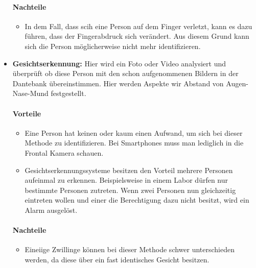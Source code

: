 \begin{itemize}
	\paragraph{Nachteile}
	\begin{itemize}
		\item In dem Fall, dass scih eine Person auf dem Finger verletzt, kann es dazu führen, dass der Fingerabdruck sich verändert. Aus diesem Grund kann sich die Person möglicherweise nicht mehr identifizieren.
	\end{itemize}
	\item \textbf{Gesichtserkennung:} Hier wird ein Foto oder Video analysiert und überprüft ob diese Person mit den schon aufgenommenen Bildern in der Dantebank übereinstimmen. Hier werden Aspekte wir Abstand von Augen-Nase-Mund festgestellt.
	\paragraph{Vorteile}
	\begin{itemize}
		\item Eine Person hat keinen oder kaum einen Aufwand, um sich bei dieser Methode zu identifizieren. Bei Smartphones muss man lediglich in die Frontal Kamera schauen.
		\item Gesichtserkennungssysteme besitzen den Vorteil mehrere Personen aufeinmal zu erkennen. Beispielsweise in einem Labor dürfen nur bestimmte Personen zutreten. Wenn zwei Personen nun gleichzeitig eintreten wollen und einer die Berechtigung dazu nicht besitzt, wird ein Alarm ausgelöst.
	\end{itemize}
	\paragraph{Nachteile}
	\begin{itemize}
		\item Eineiige Zwillinge können bei dieser Methode schwer unterschieden werden, da diese über ein fast identisches Gesicht besitzen.
	\end{itemize}
\end{itemize}

